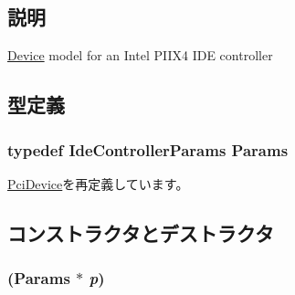 \subsection{説明}
\hyperlink{namespaceDevice}{Device} model for an Intel PIIX4 IDE controller 

\subsection{型定義}
\hypertarget{classIdeController_ac3896424d9bf2d8a838f1e2c38870d02}{
\subsubsection[{Params}]{\setlength{\rightskip}{0pt plus 5cm}typedef IdeControllerParams {\bf Params}}}
\label{classIdeController_ac3896424d9bf2d8a838f1e2c38870d02}


\hyperlink{classPciDevice_aefbfd3f2d9daf3173b779eeff32e8112}{PciDevice}を再定義しています。

\subsection{コンストラクタとデストラクタ}
\hypertarget{classIdeController_a3e91790659f429bea2b288d4809e97ab}{
\subsubsection[{IdeController}]{ ({\bf Params} $\ast$ {\em p})}}
\label{classIdeController_a3e91790659f429bea2b288d4809e97ab}



